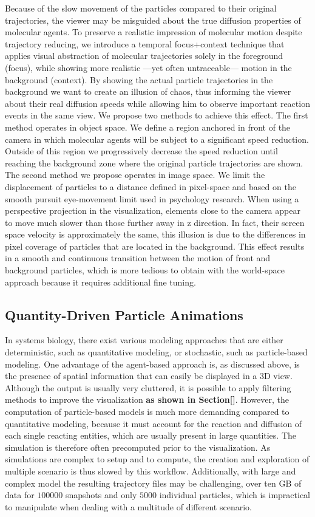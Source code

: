 Because of the slow movement of the particles compared to their original trajectories, the viewer may be misguided about the true diffusion properties of molecular agents.
To preserve a realistic impression of molecular motion despite trajectory reducing, we introduce a temporal focus+context technique that applies visual abstraction of molecular trajectories solely in the foreground (focus), while showing more realistic ---yet often untraceable--- motion in the background (context).
By showing the actual particle trajectories in the background we want to create an illusion of chaos, thus informing the viewer about their real diffusion speeds while allowing him to observe important reaction events in the same view.
We propose two methods to achieve this effect.
The first method operates in object space.
We define a region anchored in front of the camera in which molecular agents will be subject to a significant speed reduction.
Outside of this region we progressively decrease the speed reduction until reaching the background zone where the original particle trajectories are shown.
The second method we propose operates in image space.
We limit the displacement of particles to a distance defined in pixel-space and based on the smooth pursuit eye-movement limit used in psychology research.
When using a perspective projection in the visualization, elements close to the camera appear to move much slower than those further away in z direction. 
In fact, their screen space velocity is approximately the same, this illusion is due to the differences in pixel coverage of particles that are located in the background.
This effect results in a smooth and continuous transition between the motion of front and background particles, which is more tedious to obtain with the world-space approach because it requires additional fine tuning.

\subsection{Quantity-Driven Particle Animations}

In systems biology, there exist various modeling approaches that are either deterministic, such as quantitative modeling, or stochastic, such as particle-based modeling.
One advantage of the agent-based approach is, as discussed above, is the presence of spatial information that can easily be displayed in a 3D view.
Although the output is usually very cluttered, it is possible to apply filtering methods to improve the visualization\textbf{ as shown in Section[]}.
However, the computation of particle-based models is much more demanding compared to quantitative modeling, because it must account for the reaction and diffusion of each single reacting entities, which are usually present in large quantities.
The simulation is therefore often precomputed prior to the visualization.
As simulations are complex to setup and to compute, the creation and exploration of multiple scenario is thus slowed by this workflow.
Additionally, with large and complex model the resulting trajectory files may be challenging, over ten GB of data for $100000$ snapshots and only $5000$ individual particles, which is impractical to manipulate when dealing with a multitude of different scenario.

